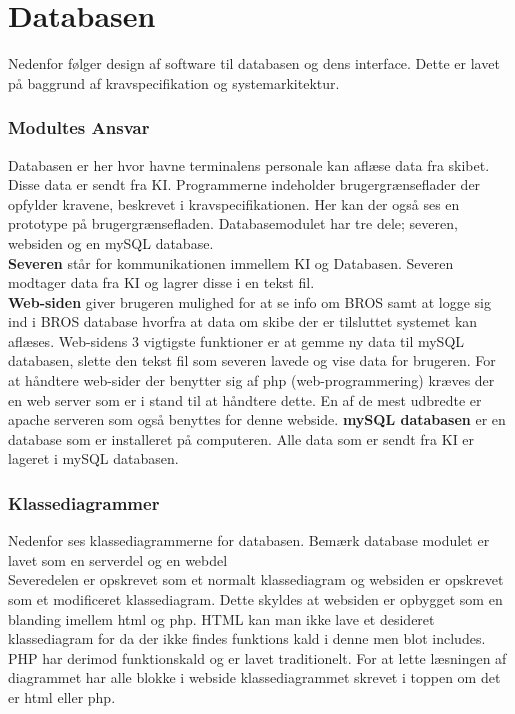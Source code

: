 \chapter{Databasen}
Nedenfor følger design af software til databasen og dens interface. Dette er lavet på baggrund af kravspecifikation og systemarkitektur. 



\subsection{Modultes Ansvar}
Databasen er her hvor havne terminalens personale kan aflæse data fra skibet. Disse data er sendt fra KI. Programmerne indeholder brugergrænseflader der opfylder kravene, beskrevet i kravspecifikationen. Her kan der også ses en prototype på brugergrænsefladen.
Databasemodulet har tre dele; severen, websiden og en mySQL database. \\
\textbf{Severen} står for kommunikationen immellem KI og Databasen. Severen modtager data fra KI og lagrer disse i en tekst fil.\\
\textbf{Web-siden} giver brugeren mulighed for at se info om BROS samt at logge sig ind i BROS database hvorfra at data om skibe der er tilsluttet systemet kan aflæses. Web-sidens 3 vigtigste funktioner er at gemme ny data til mySQL databasen, slette den tekst fil som severen lavede og vise data for brugeren. For at håndtere web-sider der benytter sig af php (web-programmering) kræves der en web server som er i stand til at håndtere dette. En af de mest udbredte er apache serveren som også benyttes for denne webside.
\textbf{mySQL databasen} er en database som er  installeret på computeren. Alle data som er sendt fra KI er lageret i mySQL databasen.

\subsection{Klassediagrammer}
Nedenfor ses klassediagrammerne for databasen. Bemærk database modulet er lavet som en serverdel og en webdel\\
Severedelen er opskrevet som et normalt klassediagram og websiden er opskrevet som et modificeret klassediagram. Dette skyldes at websiden er opbygget som en blanding imellem html og php. HTML kan man ikke lave et desideret klassediagram for da der ikke findes funktions kald i denne men blot includes. PHP har derimod funktionskald og er lavet traditionelt. For at lette læsningen af diagrammet har alle blokke i webside klassediagrammet skrevet i toppen om det er html eller php.

